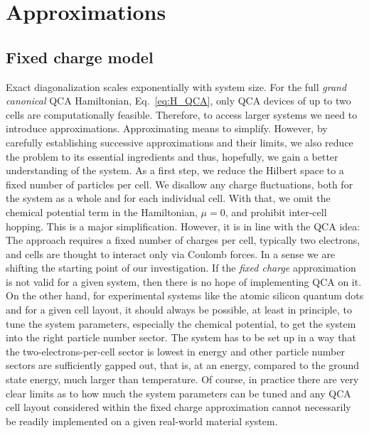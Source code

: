\chapter{Approximations}
\graphicspath{{../gfx/chapter02/}{../plots/chapter02/}}
\newcommand{\ket}[1]{\left|#1\right>}
\newcommand{\bra}[1]{\left<#1\right|}


\section{Fixed charge model}

Exact diagonalization scales exponentially with system size. For the full
\emph{grand canonical} QCA Hamiltonian, Eq.~\ref{eq:H_QCA}, only QCA devices of
up to two cells are computationally feasible. Therefore, to access larger
systems we need to introduce approximations. Approximating means to simplify.
However, by carefully establishing successive approximations and their limits,
we also reduce the problem to its essential ingredients and thus, hopefully, we
gain a better understanding of the system. As a first step, we reduce the
Hilbert space to a fixed number of particles per cell. We disallow any
charge fluctuations, both for the system as a whole and for each individual
cell. With that, we omit the chemical potential term in the Hamiltonian, $\mu =
0$, and prohibit inter-cell hopping. This is a major simplification. However, it
is in line with the QCA idea: The approach requires a fixed number of charges
per cell, typically two electrons, and cells are thought to interact only via
Coulomb forces. In a sense we are shifting the starting point of our
investigation. If the \emph{fixed charge} approximation is not valid for a given
system, then there is no hope of implementing QCA on it. On the other hand, for
experimental systems like the atomic silicon quantum dots and for a given cell
layout, it should always be possible, at least in principle, to tune the system
parameters, especially the chemical potential, to get the system into the right
particle number sector. The system has to be set up in a way that the
two-electrons-per-cell sector is lowest in energy and other particle number
sectors are sufficiently gapped out, that is, at an energy, compared to the
ground state energy, much larger than temperature. Of course, in practice there
are very clear limits as to how much the system parameters can be tuned and any
QCA cell layout considered within the fixed charge approximation cannot
necessarily be readily implemented on a given real-world material system.

